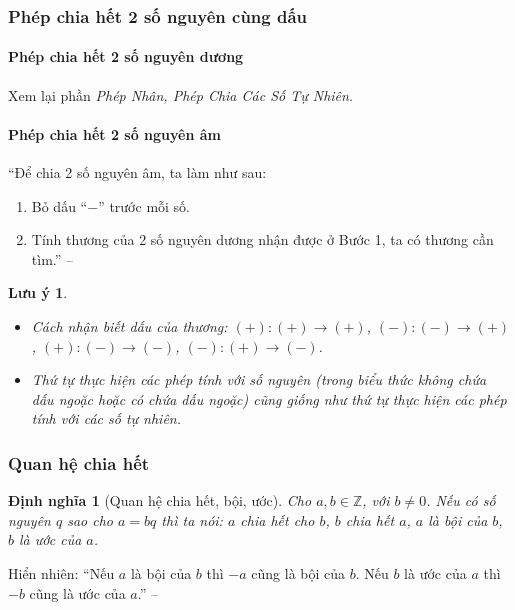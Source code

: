 \documentclass{article}
\numberwithin{equation}{section}
\newtheorem{dinhnghia}{Định nghĩa}[section]
\newtheorem{luuy}{Lưu ý}[section]
\begin{document}
\subsubsection{Phép chia hết 2 số nguyên cùng dấu}

\paragraph{Phép chia hết 2 số nguyên dương}
Xem lại phần \textit{Phép Nhân, Phép Chia Các Số Tự Nhiên}.

\paragraph{Phép chia hết 2 số nguyên âm}
``Để chia 2 số nguyên âm, ta làm như sau:
\begin{enumerate}
	\item Bỏ dấu ``$-$'' trước mỗi số.
	\item Tính thương của 2 số nguyên dương nhận được ở Bước 1, ta có thương cần tìm.'' -- \cite[p. 85]{SGK_Toan_6_Canh_Dieu_tap_1}
\end{enumerate}

\begin{luuy}
	\begin{itemize}
		\item Cách nhận biết dấu của thương: $(+):(+)\to(+)$, $(-):(-)\to(+)$, $(+):(-)\to(-)$, $(-):(+)\to(-)$.
		\item Thứ tự thực hiện các phép tính với số nguyên (trong biểu thức không chứa dấu ngoặc hoặc có chứa dấu ngoặc) cũng giống như thứ tự thực hiện các phép tính với các số tự nhiên.
	\end{itemize}
\end{luuy}

\subsubsection{Quan hệ chia hết}

\begin{dinhnghia}[Quan hệ chia hết, bội, ước]
	Cho $a,b\in\mathbb{Z}$, với $b\ne 0$. Nếu có số nguyên $q$ sao cho $a = bq$ thì ta nói: $a$ \emph{chia hết cho} $b$, $b$ \emph{chia hết} $a$, $a$ là \emph{bội} của $b$, $b$ là \emph{ước} của $a$.
\end{dinhnghia}
Hiển nhiên: ``Nếu $a$ là bội của $b$ thì $-a$ cũng là bội của $b$. Nếu $b$ là ước của $a$ thì $-b$ cũng là ước của $a$.'' -- \cite[p. 86]{SGK_Toan_6_Canh_Dieu_tap_1}
\end{document}

